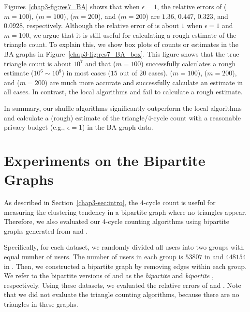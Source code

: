 Figures~\ref{chap3-fig:res7_BA} shows that when $\epsilon=1$, the relative errors of \AlgWSTriVR{} ($m=100$), \AlgWSCyc{} ($m=100$), \AlgWSTriVR{} ($m=200$), and \AlgWSCyc{} ($m=200$) are $1.36$, $0.447$, $0.323$, and $0.0928$, respectively.
Although the relative error of \AlgWSTriVR{} is about $1$ when $\epsilon=1$ and $m=100$, we argue that it is still useful for calculating a rough estimate of the triangle count.
To explain this, we show box plots of counts or estimates in the BA graphs in Figure~\ref{chap3-fig:res7_BA_box}.
This figure shows that the true triangle count is about $10^7$ and that \AlgWSTriVR{} ($m=100$) successfully calculates a rough estimate ($10^6 \sim 10^8$) in most cases ($15$ out of $20$ cases).
\AlgWSCyc{} ($m=100$), \AlgWSTriVR{} ($m=200$), and \AlgWSCyc{} ($m=200$) are much more accurate and successfully calculate an estimate in all cases.
In contrast, the local algorithms \AlgWLTri{} and \AlgWLCyc{} fail to calculate a rough estimate.

In summary, our shuffle algorithms significantly outperform the local algorithms and calculate a (rough) estimate of the triangle/4-cycle count with a reasonable privacy budget (e.g., $\epsilon=1$) in the BA graph data.

\section{Experiments on the Bipartite Graphs}
\label{chap3-sec:bipartite}
As described in Section~\ref{chap3-sec:intro}, the 4-cycle count is useful for measuring the clustering tendency in a bipartite graph where no triangles appear.
Therefore, we also evaluated our 4-cycle counting algorithms using bipartite graphs generated from \Gplus{} and \IMDB{}.

Specifically, for each dataset, we randomly divided all users into two groups with equal number of users.
The number of users in each group is $53807$ in \Gplus{} and $448154$ in \IMDB{}.
Then, we constructed a bipartite graph by removing edges within each group.
We refer to the bipartite versions of \Gplus{} and \IMDB{} as the \textit{bipartite \Gplus{}} and \textit{bipartite \IMDB{}}, respectively.
Using these datasets, we evaluated the relative errors of \AlgWSCyc{} and \AlgWLCyc{}.
Note that we did not evaluate the triangle counting algorithms, because there are no triangles in these graphs.


